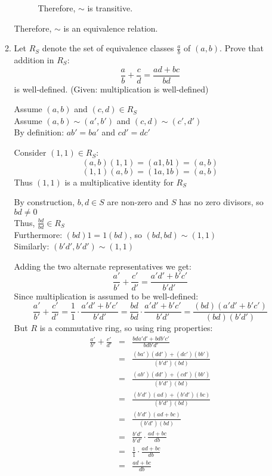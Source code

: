 \documentclass[letterpaper,12pt,fleqn]{article}
\begin{document}
\begin{enumerate}
\begin{enumerate}
\begin{description}

      Therefore, $\sim$ is transitive.
    \end{description}

    Therefore, $\sim$ is an equivalence relation.

  \item Let $R_S$ denote the set of equivalence classes $\frac{a}{b}$ of
    $(a,b)$. Prove that addition in $R_S$:
    \[\frac{a}{b}+\frac{c}{d}=\frac{ad+bc}{bd}\]
    is well-defined. (Given: multiplication is well-defined)

    Assume $(a,b)$ and $(c,d)\in R_S$ \\
    Assume $(a,b)\sim(a',b')$ and $(c,d)\sim(c',d')$ \\
    By definition: $ab'=ba'$ and $cd'=dc'$

    Consider $(1,1)\in R_S$:
    \[(a,b)(1,1)=(a1,b1)=(a,b)\]
    \[(1,1)(a,b)=(1a,1b)=(a,b)\]
    Thus $(1,1)$ is a multiplicative identity for $R_S$
 
    By construction, $b,d\in S$ are non-zero and $S$ has no zero divisors, so
    $bd\ne0$ \\
    Thus, $\frac{bd}{bd}\in R_S$ \\
    Furthermore: $(bd)1=1(bd)$, so $(bd,bd)\sim(1,1)$ \\
    Similarly: $(b'd',b'd')\sim(1,1)$

    Adding the two alternate representatives we get:
    \[\frac{a'}{b'}+\frac{c'}{d'}=\frac{a'd'+b'c'}{b'd'}\]
    Since multiplication is assumed to be well-defined:
    \[\frac{a'}{b'}+\frac{c'}{d'}=\frac{1}{1}\cdot\frac{a'd'+b'c'}{b'd'}=
    \frac{bd}{bd}\cdot\frac{a'd'+b'c'}{b'd'}=
    \frac{(bd)(a'd'+b'c')}{(bd)(b'd')}\]
    But $R$ is a commutative ring, so using ring properties:
    \begin{eqnarray*}
      \frac{a'}{b'}+\frac{c'}{d'} &=& \frac{bda'd'+bdb'c'}{bdb'd'} \\
      &=& \frac{(ba')(dd')+(dc')(bb')}{(b'd')(bd)} \\
      &=& \frac{(ab')(dd')+(cd')(bb')}{(b'd')(bd)} \\
      &=& \frac{(b'd')(ad)+(b'd')(bc)}{(b'd')(bd)} \\
      &=& \frac{(b'd')(ad+bc)}{(b'd')(bd)} \\
      &=& \frac{b'd'}{b'd'}\cdot\frac{ad+bc}{db} \\
      &=& \frac{1}{1}\cdot\frac{ad+bc}{db} \\
      &=& \frac{ad+bc}{db}
    \end{eqnarray*}


\end{enumerate}
\end{enumerate}
\end{document}
